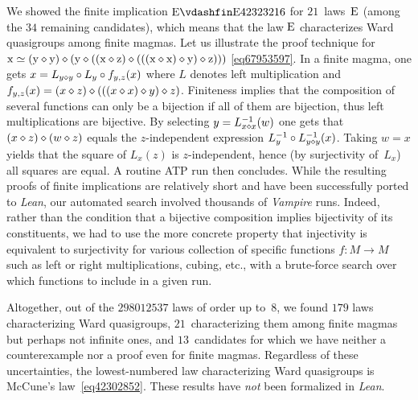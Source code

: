 We showed the finite implication $\E\vdashfin\Eq{42323216}$ for $21$~laws~$\mathrm{E}$ (among the $34$ remaining candidates), which means that the law $\mathrm{E}$ characterizes Ward quasigroups among finite magmas.  Let us illustrate the proof technique for $\mathrm{x} \simeq (\mathrm{y} \diamond \mathrm{y}) \diamond (\mathrm{y} \diamond ((\mathrm{x} \diamond \mathrm{z}) \diamond (((\mathrm{x} \diamond \mathrm{x}) \diamond \mathrm{y}) \diamond \mathrm{z})))$ \eqref{eq67953597}.  In a finite magma, one gets $x = L_{y\diamond y} \circ L_y \circ f_{y,z}(x)$ where $L$ denotes left multiplication and $f_{y,z}(x) = (x\diamond z) \diamond (((x \diamond x) \diamond y) \diamond z)$.  Finiteness implies that the composition of several functions can only be a bijection if all of them are bijection, thus left multiplications are bijective.  By selecting $y=L_{x\diamond x}^{-1}(w)$ one gets that $(x\diamond z)\diamond (w\diamond z)$ equals the $z$-independent expression $L_y^{-1} \circ L_{y\diamond y}^{-1}(x)$.  Taking $w=x$ yields that the square of $L_x(z)$ is $z$-independent, hence (by surjectivity of~$L_x$) all squares are equal.  A routine ATP run then concludes.
While the resulting proofs of finite implications are relatively short and have been successfully ported to \emph{Lean}, our automated search involved thousands of \emph{Vampire} runs.
Indeed, rather than the condition that a bijective composition implies bijectivity of its constituents, we had to use the more concrete property that injectivity is equivalent to surjectivity for various collection of specific functions $f\colon M\to M$ such as left or right multiplications, cubing, etc.\@, with a brute-force search over which functions to include in a given run.

Altogether, out of the $\num{298012537}$ laws of order up to~$8$, we found $179$ laws characterizing Ward quasigroups, $21$~characterizing them among finite magmas but perhaps not infinite ones, and $13$~candidates for which we have neither a counterexample nor a proof even for finite magmas.  Regardless of these uncertainties, the lowest-numbered law characterizing Ward quasigroups is McCune's law~\eqref{eq42302852}.  These results have \emph{not} been formalized in \emph{Lean}.

